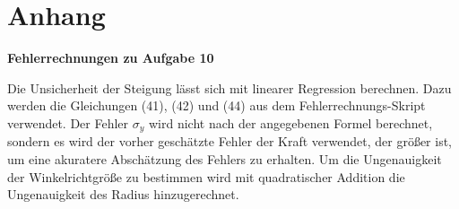 \documentclass[a4paper, 11pt, ngerman]{scrartcl}
\begin{document}


\section{Anhang}
\textbf{Fehlerrechnungen zu Aufgabe 10}

Die Unsicherheit der Steigung lässt sich mit linearer Regression berechnen. Dazu werden die Gleichungen (41), (42) und (44) aus dem Fehlerrechnungs-Skript verwendet. Der Fehler $\sigma_y$ wird nicht nach der angegebenen Formel berechnet, sondern es wird der vorher geschätzte Fehler der Kraft verwendet, der größer ist, um eine akuratere Abschätzung des Fehlers zu erhalten. Um die Ungenauigkeit der Winkelrichtgröße zu bestimmen wird mit quadratischer Addition die Ungenauigkeit des Radius hinzugerechnet.
\end{document}

